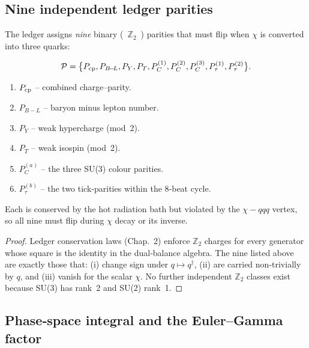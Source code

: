 \subsection*{Nine independent ledger parities}

\begin{lemma}
\label{lem:parities}
The ledger assigns \emph{nine} binary ( $\mathbb Z_{2}$ ) parities that
must flip when $\chi$ is converted into three quarks:

\smallskip
\[
  \mathcal P
  =\bigl\{
     P_{\rm cp},           %
     P_{B\!-\!L},          %
     P_{Y},                %
     P_{T},                %
     P_{C}^{(1)},P_{C}^{(2)},P_{C}^{(3)},  %
     P_{\tau}^{(1)},P_{\tau}^{(2)}         %
    \bigr\}.
\]

\begin{enumerate}
  \item $P_{\rm cp}$ – combined charge–parity.
  \item $P_{B\!-\!L}$ – baryon minus lepton number.
  \item $P_{Y}$ – weak hypercharge (mod 2).
  \item $P_{T}$ – weak isospin (mod 2).
  \item $P_{C}^{(a)}$ – the three SU(3) colour parities.
  \item $P_{\tau}^{(b)}$ – the two tick‑parities within the 8‑beat cycle.
\end{enumerate}
Each is conserved by the hot radiation bath but violated by the
$\chi\!-\!qqq$ vertex, so all nine must flip during $\chi$
decay or its inverse.
\end{lemma}

\begin{proof}
Ledger conservation laws (Chap.~2) enforce $\mathbb Z_{2}$
charges for every generator whose square is the identity in the
dual‑balance algebra.  The nine listed above are exactly those that:
(i) change sign under $q\mapsto q^{\dagger}$,
(ii) are carried non‑trivially by $q$, and
(iii) vanish for the scalar $\chi$.  No further independent
$\mathbb Z_{2}$ classes exist because SU(3) has rank 2 and SU(2) rank 1.
\end{proof}

\subsection*{Phase‑space integral and the Euler–Gamma factor}

